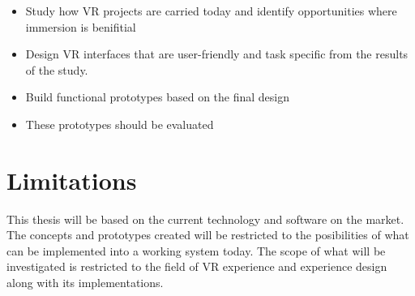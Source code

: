 \begin{itemize}
	\item Study how VR projects are carried today and identify opportunities where immersion is benifitial
	\item Design VR interfaces that are user-friendly and task specific from the results of the study.
	\item Build functional prototypes based on the final design
	\item These prototypes should be evaluated
\end{itemize}

\section{Limitations}
This thesis will be based on the current technology and software on the market. The concepts and prototypes created will be restricted to the posibilities of what can be implemented into a working system today. The scope of what will be investigated is restricted to the field of VR experience and experience design along with its implementations.
